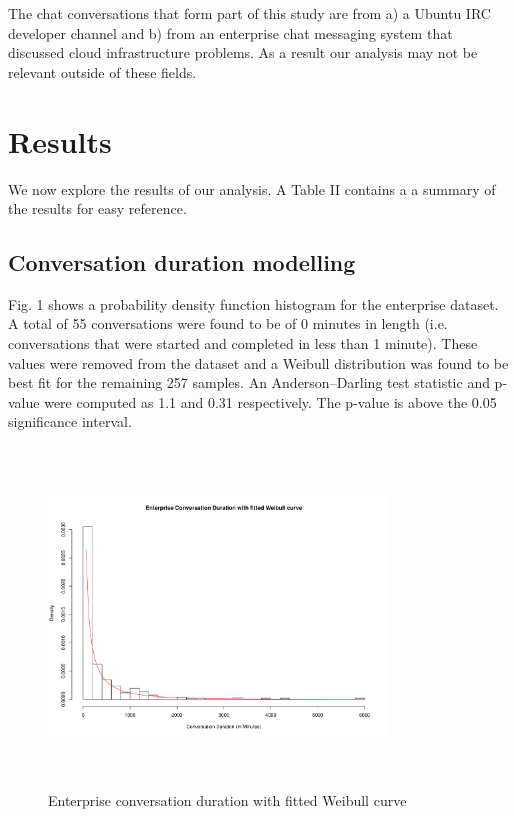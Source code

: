 \documentclass[conference]{IEEEtran}
\begin{document}
The chat conversations that form part of this study are from a) a Ubuntu IRC developer channel and b) from an enterprise chat messaging system that discussed cloud infrastructure problems. As a result our analysis may not be relevant outside of these fields. \par

\section{Results}

We now explore the results of our analysis. A Table II contains a a summary of the results for easy reference.

\subsection{Conversation duration modelling}

Fig. 1 shows a probability density function histogram for the enterprise dataset. A total of 55 conversations were found to be of 0 minutes in length (i.e. conversations that were started and completed in less than 1 minute). These values were removed from the dataset and a Weibull distribution was found to be best fit for the remaining 257 samples. An Anderson--Darling test statistic and p-value were computed as 1.1 and 0.31 respectively. The p-value is above the 0.05 significance interval. 

\begin{figure}
\begin{center}
\includegraphics[height=9cm, width=9cm]{01_duration_enterprise.pdf} 
\caption{Enterprise conversation duration with fitted Weibull curve}
\end{center}
\label{fig:duration_ent}
\end{figure}
\end{document}
